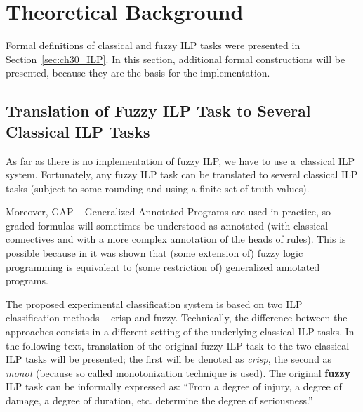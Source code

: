 \section{Theoretical Background} \label{sec:ILP}

Formal definitions of classical and fuzzy ILP tasks were presented in Section~\ref{sec:ch30_ILP}. In this section, additional formal constructions will be presented, because they are the basis for the implementation.


\subsection{Translation of Fuzzy ILP Task to Several Classical ILP Tasks} \label{sec:ch80_GAP}

As far as there is no implementation of fuzzy ILP, we have to use a~classical ILP system. Fortunately, any fuzzy ILP task can be translated to several classical ILP tasks (subject to some rounding and using a finite set of truth values).

Moreover, GAP -- Generalized Annotated Programs \citep{Kifer:1992:TGA:139720.139723} are used in practice, so graded formulas will sometimes be understood as annotated (with classical connectives and with a more complex annotation of the heads of rules). This is possible because in \citep{biblio:KLV} it was shown that (some extension of) fuzzy logic programming is equivalent to (some restriction of) generalized annotated programs. 

The proposed experimental classification system is based on two ILP classification methods -- crisp and fuzzy. 
Technically, the difference between the approaches consists in a different setting of the underlying classical ILP tasks. 
In the following text, translation of the original fuzzy ILP task to the two classical ILP tasks will be presented; the first will be denoted as \emph{crisp}, the second as \emph{monot} (because so called monotonization technique is used). The original \textbf{fuzzy} ILP task can be informally expressed as: ``From a degree of injury, a degree of damage, a degree of duration, etc. determine the degree of seriousness.''   

